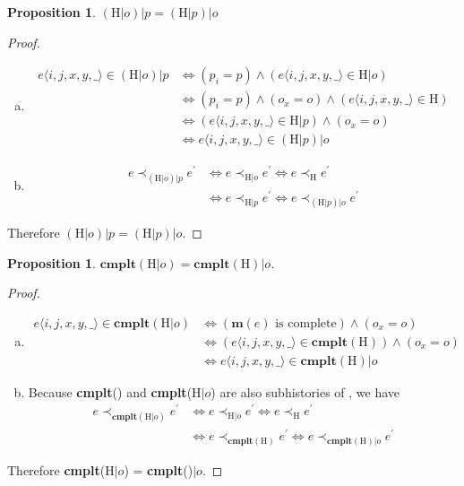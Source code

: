 \documentclass[a4paper,USenglish]{lipics-v2016}
\newtheorem{prop}[theorem]{Proposition}
\newcommand{\cmplt}{\textbf{cmplt}}
\newcommand{\mym}{\textbf{m}}
\newcommand{\his}{\text{H}}
\newcommand{\myvert}{\vert}
\begin{document}
\begin{prop}\label{lem_subhis_op}
	$(\his \myvert o) \myvert p = (\his \myvert p) \myvert o$
\end{prop}
\begin{proof}
	\begin{enumerate}[(a)]
		\item
		\begin{align*}
		e \langle i, j, x, y, \_ \rangle \in (\his \myvert o) \myvert p &\iff (p_i = p) \land (e \langle i, j, x, y, \_ \rangle \in \his \myvert o)\\
		&\iff (p_i = p) \land (o_x = o) \land (e \langle i, j, x, y, \_ \rangle \in \his)\\
		&\iff (e \langle i, j, x, y, \_ \rangle \in \his \myvert p) \land (o_x = o)\\
		&\iff e \langle i, j, x, y, \_ \rangle \in (\his \myvert p) \myvert o
		\end{align*}
		\item
		\begin{align*}
		e \prec_{(\his \myvert o) \myvert p} e^\prime &\iff e \prec_{\his \myvert o} e^\prime \iff e \prec_{\his} e^\prime\\
		&\iff e \prec_{\his \myvert p} e^\prime \iff e \prec_{(\his \myvert p) \myvert o} e^\prime
		\end{align*}
	\end{enumerate}
	Therefore $(\his \myvert o) \myvert p = (\his \myvert p) \myvert o$.
\end{proof}

\begin{prop}\label{lem_subhis_complo}
	$\cmplt(\his \myvert o) = \cmplt(\his) \myvert o$.
\end{prop}
\begin{proof}
	\begin{enumerate}[(a)]
		\item
		\begin{align*}
		e \langle i, j, x, y, \_ \rangle \in \cmplt(\his \myvert o) &\iff (\mym(e) \text{ is complete}) \land (o_x=o)\\
		&\iff (e \langle i, j, x, y, \_ \rangle \in \cmplt(\his)) \land (o_x=o)\\
		&\iff e \langle i, j, x, y, \_ \rangle \in \cmplt(\his) \myvert o
		\end{align*}
		
		\item
		Because \cmplt({\his}) and \cmplt($\his \myvert o$) are also subhistories of {\his}, we have
		\begin{align*}
		e \prec_{\cmplt(\his \myvert o)} e^\prime &\iff e \prec_{\his \myvert o} e^\prime \iff e \prec_{\his} e^\prime\\
		&\iff e \prec_{\cmplt(\his)} e^\prime \iff e \prec_{\cmplt(\his) \myvert o} e^\prime
		\end{align*}
	\end{enumerate}
	Therefore \cmplt($\his \myvert o$) = \cmplt({\his})$\myvert o$.
\end{proof}
\end{document}
